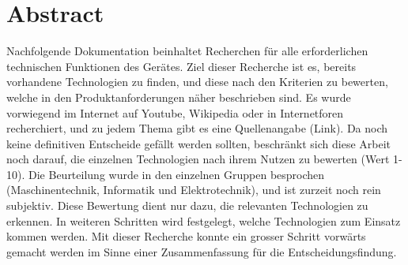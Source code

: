 \section{Abstract}
Nachfolgende Dokumentation beinhaltet Recherchen für alle erforderlichen technischen Funktionen des Gerätes. Ziel dieser Recherche ist es, bereits vorhandene Technologien zu finden, und diese nach den Kriterien zu bewerten, welche in den Produktanforderungen näher beschrieben sind. Es wurde vorwiegend im Internet auf Youtube, Wikipedia oder in Internetforen recherchiert, und zu jedem Thema gibt es eine Quellenangabe (Link). Da noch keine definitiven Entscheide gefällt werden sollten, beschränkt sich diese Arbeit noch darauf, die einzelnen Technologien nach ihrem Nutzen zu bewerten (Wert 1-10). Die Beurteilung wurde in den einzelnen Gruppen besprochen (Maschinentechnik, Informatik und Elektrotechnik), und ist zurzeit noch rein subjektiv. Diese Bewertung dient nur dazu, die relevanten Technologien zu erkennen. In weiteren Schritten wird festgelegt, welche Technologien zum Einsatz kommen werden. Mit dieser Recherche konnte ein grosser Schritt vorwärts gemacht werden im Sinne einer Zusammenfassung für die Entscheidungsfindung.
